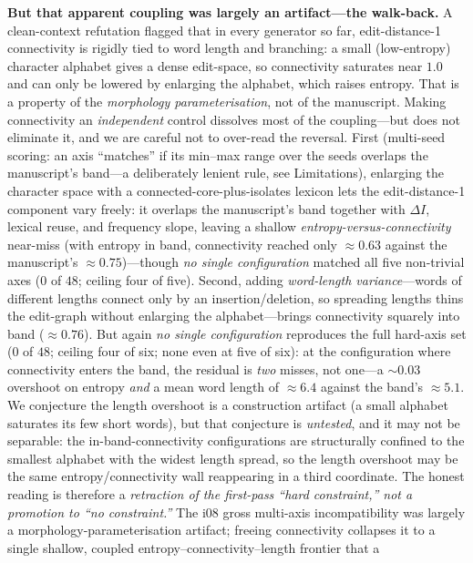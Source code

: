 \documentclass[11pt]{article}
\begin{document}
\textbf{But that apparent coupling was largely an artifact---the walk-back.} A clean-context
refutation flagged that in every generator so far, edit-distance-1 connectivity is rigidly
tied to word length and branching: a small (low-entropy) character alphabet gives a dense
edit-space, so connectivity saturates near $1.0$ and can only be lowered by enlarging the
alphabet, which raises entropy. That is a property of the \emph{morphology
parameterisation}, not of the manuscript. Making connectivity an \emph{independent} control
dissolves most of the coupling---but does not eliminate it, and we are careful not to
over-read the reversal. First (multi-seed scoring: an axis ``matches'' if its
min--max range over the seeds overlaps the manuscript's band---a deliberately lenient rule,
see Limitations), enlarging the character space with a connected-core-plus-isolates lexicon
lets the edit-distance-1 component vary freely: it overlaps the manuscript's band together
with $\Delta I$, lexical reuse, and frequency slope, leaving a shallow
\emph{entropy-versus-connectivity} near-miss (with entropy in band, connectivity reached
only $\approx 0.63$ against the manuscript's $\approx 0.75$)---though \emph{no single
configuration} matched all five non-trivial axes ($0$ of $48$; ceiling four of five).
Second, adding \emph{word-length variance}---words of different lengths connect only by an
insertion/deletion, so spreading lengths thins the edit-graph without enlarging the
alphabet---brings connectivity squarely into band ($\approx 0.76$). But again \emph{no
single configuration} reproduces the full hard-axis set ($0$ of $48$; ceiling four of six;
none even at five of six): at the configuration where connectivity enters the band, the
residual is \emph{two} misses, not one---a $\sim\!0.03$ overshoot on entropy \emph{and} a
mean word length of $\approx 6.4$ against the band's $\approx 5.1$. We conjecture the length
overshoot is a construction artifact (a small alphabet saturates its few short words), but
that conjecture is \emph{untested}, and it may not be separable: the in-band-connectivity
configurations are structurally confined to the smallest alphabet with the widest length
spread, so the length overshoot may be the same entropy/connectivity wall reappearing in a
third coordinate. The honest reading is therefore a \emph{retraction of the first-pass
``hard constraint,'' not a promotion to ``no constraint.''} The i08 gross multi-axis
incompatibility was largely a morphology-parameterisation artifact; freeing connectivity
collapses it to a single shallow, coupled entropy--connectivity--length frontier that a
\end{document}
